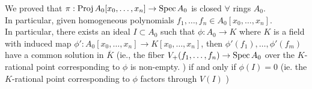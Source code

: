 \documentclass[../main.tex]{subfiles}
\begin{document}
\begin{rmq}
	We proved that $\pi: \operatorname{Proj} A_0[x_0,\ldots,x_n] \to \operatorname{Spec} A_0$ is closed $\forall $ rings $A_0$.\\
	In particular, given homogeneous polynomials $f_1,\ldots,f_n\in A_0[x_0,\ldots,x_n]$.\\
	In particular, there exists an ideal $I \subset A_0$ such that $\phi: A_0\to K$ where $K$ is a field with induced map $\phi': A_0[x_0,\ldots,x_n] \to K[x_0,\ldots,x_n] $, then $\phi'( f_1) ,\ldots,\phi'( f_m) $ have a common solution in $\overline{K}$ (ie., the fiber $V_+( f_1,\ldots,f_n)\to \operatorname{Spec} A_0 $ over the $K$-rational point corresponding to $\phi$ is non-empty. ) 	if and only if $\phi( I) =0$ (ie. the $K$-rational point corresponding to $\phi$ factors through $V( I) $ ) 
\end{rmq}
\end{document}
